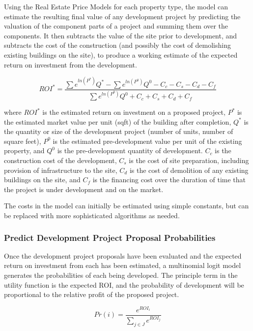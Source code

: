 Using the Real Estate Price Models for each property type, the model can estimate the resulting final value of any
development project by predicting the valuation of the component parts of a project and summing them
over the components.  It then subtracts the value of the site prior to development, and subtracts the
cost of the construction (and possibly the cost of demolishing existing buildings on the site), to produce
a working estimate of the expected return on investment from the development.

\begin{equation}
ROI^* = \frac{\sum{e^{ln(P^*)}Q^*}-\sum{e^{ln(P^0)}Q^0 - C_c - C_s - C_d - C_f}}{\sum{e^{ln(P^0)}Q^0 + C_c + C_s + C_d + C_f}}
\end{equation}

where $ROI^*$ is the estimated return on investment on a proposed project, $P^*$ is the estimated market value per unit (sqft)
of the building after completion, $Q^*$ is the quantity or size of the development project (number of units, number of square feet),
$P^0$ is the estimated pre-development value per unit of the existing property, and $Q^0$ is the pre-development quantity
of development.  $C_c$ is the construction cost of the development, $C_s$ is the cost of site preparation, including provision of 
infrastructure to the site, $C_d$ is the cost of demolition of any existing buildings on the site, and $C_f$ is the financing cost over
the duration of time that the project is under development and on the market. 

The costs in the model can initially be estimated using simple constants, but can be replaced with more sophisticated 
algorithms as needed.

\subsubsection{Predict Development Project Proposal Probabilities}
Once the development project proposals have been evaluated and the expected 
return on investment from each has been
estimated, a multinomial logit model generates the probabilities of each being
developed.  The principle term in the utility function is the expected ROI, and the probability of
development will be proportional to the relative profit of the proposed project.

\begin{equation}
Pr(i) = \frac{e^{ROI_i}}{\sum_{j \in J}{e^{ROI_j}}}
\end{equation}

